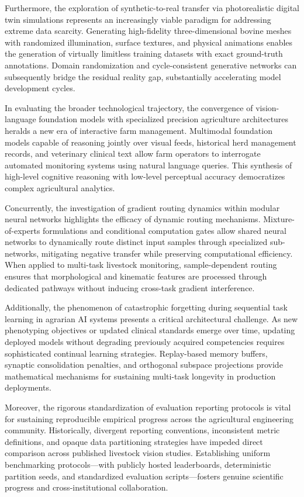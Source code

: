 \documentclass[Times,12pt,oneside,openany,print,index]{report}
\begin{document}
Furthermore, the exploration of synthetic-to-real transfer via photorealistic digital twin simulations represents an increasingly viable paradigm for addressing extreme data scarcity. Generating high-fidelity three-dimensional bovine meshes with randomized illumination, surface textures, and physical animations enables the generation of virtually limitless training datasets with exact ground-truth annotations. Domain randomization and cycle-consistent generative networks can subsequently bridge the residual reality gap, substantially accelerating model development cycles.

In evaluating the broader technological trajectory, the convergence of vision-language foundation models with specialized precision agriculture architectures heralds a new era of interactive farm management. Multimodal foundation models capable of reasoning jointly over visual feeds, historical herd management records, and veterinary clinical text allow farm operators to interrogate automated monitoring systems using natural language queries. This synthesis of high-level cognitive reasoning with low-level perceptual accuracy democratizes complex agricultural analytics.

Concurrently, the investigation of gradient routing dynamics within modular neural networks highlights the efficacy of dynamic routing mechanisms. Mixture-of-experts formulations and conditional computation gates allow shared neural networks to dynamically route distinct input samples through specialized sub-networks, mitigating negative transfer while preserving computational efficiency. When applied to multi-task livestock monitoring, sample-dependent routing ensures that morphological and kinematic features are processed through dedicated pathways without inducing cross-task gradient interference.

Additionally, the phenomenon of catastrophic forgetting during sequential task learning in agrarian AI systems presents a critical architectural challenge. As new phenotyping objectives or updated clinical standards emerge over time, updating deployed models without degrading previously acquired competencies requires sophisticated continual learning strategies. Replay-based memory buffers, synaptic consolidation penalties, and orthogonal subspace projections provide mathematical mechanisms for sustaining multi-task longevity in production deployments.

Moreover, the rigorous standardization of evaluation reporting protocols is vital for sustaining reproducible empirical progress across the agricultural engineering community. Historically, divergent reporting conventions, inconsistent metric definitions, and opaque data partitioning strategies have impeded direct comparison across published livestock vision studies. Establishing uniform benchmarking protocols—with publicly hosted leaderboards, deterministic partition seeds, and standardized evaluation scripts—fosters genuine scientific progress and cross-institutional collaboration.
\end{document}
